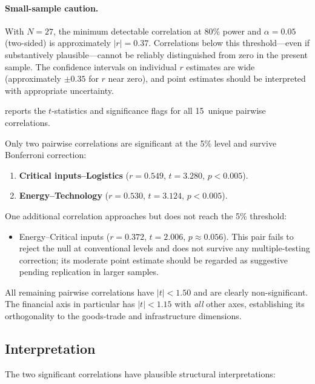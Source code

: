 \paragraph{Small-sample caution.}
With $N = 27$, the minimum detectable correlation at 80\% power
and $\alpha = 0.05$ (two-sided) is approximately $|r| = 0.37$.
Correlations below this threshold---even if substantively
plausible---cannot be reliably distinguished from zero in the
present sample.  The confidence intervals on individual
$r$ estimates are wide (approximately $\pm 0.35$ for $r$ near zero),
and point estimates should be interpreted with appropriate
uncertainty.

 reports the $t$-statistics and significance
flags for all 15~unique pairwise correlations.



Only two pairwise correlations are significant at the 5\% level
and survive Bonferroni correction:
\begin{enumerate}[leftmargin=2em]
  \item \textbf{Critical inputs--Logistics} ($r = 0.549$,
    $t = 3.280$, $p < 0.005$).
  \item \textbf{Energy--Technology} ($r = 0.530$,
    $t = 3.124$, $p < 0.005$).
\end{enumerate}

One additional correlation approaches but does not reach the 5\%
threshold:
\begin{itemize}[leftmargin=2em]
  \item Energy--Critical inputs ($r = 0.372$, $t = 2.006$,
    $p \approx 0.056$).  This pair fails to reject the null at
    conventional levels and does not survive any multiple-testing
    correction; its moderate point estimate should be regarded
    as suggestive pending replication in larger samples.
\end{itemize}

All remaining pairwise correlations have $|t| < 1.50$ and are
clearly non-significant.  The financial axis in particular has
$|t| < 1.15$ with \emph{all} other axes, establishing its orthogonality
to the goods-trade and infrastructure dimensions.

\subsection{Interpretation}

The two significant correlations have plausible structural
interpretations:

